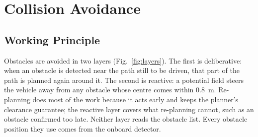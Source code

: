 \section{Collision Avoidance}
\label{sec:avoidance}

\subsection{Working Principle}
Obstacles are avoided in two layers (Fig.~\ref{fig:layers}). The first
is deliberative: when an obstacle is detected near the path still to be
driven, that part of the path is planned again around it. The second is
reactive: a potential field \cite{szczepanski2022} steers the vehicle away
from any obstacle whose centre comes within $0.8$~m. Re-planning does most of
the work because it acts early and keeps the planner's clearance guarantee;
the reactive layer covers what re-planning cannot, such as an obstacle
confirmed too late. Neither layer reads the obstacle list. Every
obstacle position they use comes from the onboard detector.

